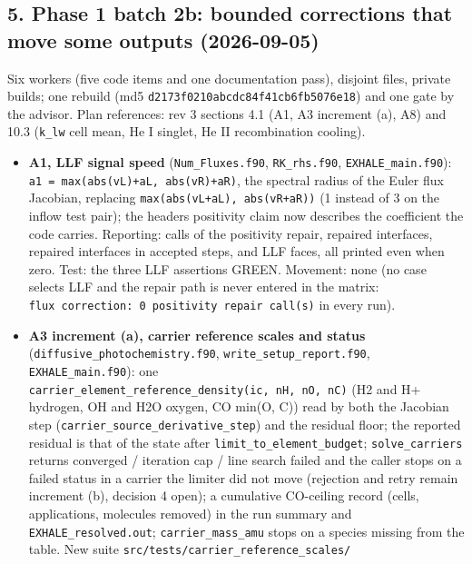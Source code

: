 \documentclass[english,a4paper]{my_memo}
\providecommand{\tightlist}{\setlength{\itemsep}{0pt}\setlength{\parskip}{0pt}}
\begin{document}
\subsection{5. Phase 1 batch 2b: bounded corrections that move some outputs (2026-09-05)}\label{5-phase-1-batch-2b-bounded-corrections-that-move-some-outputs-2026-09-05}

Six workers (five code items and one documentation pass), disjoint files,
private builds; one rebuild (md5 \texttt{d2173f0210abcdc84f41cb6fb5076e18}) and one
gate by the advisor. Plan references: rev 3 sections 4.1 (A1, A3 increment
(a), A8) and 10.3 (\texttt{k\_lw} cell mean, He I singlet, He II recombination
cooling).

\begin{itemize}
\tightlist
\item
  \textbf{A1, LLF signal speed} (\texttt{Num\_Fluxes.f90}, \texttt{RK\_rhs.f90}, \texttt{EXHALE\_main.f90}):
  \texttt{a1\ =\ max(abs(vL)+aL,\ abs(vR)+aR)}, the spectral radius of the Euler flux
  Jacobian, replacing \texttt{max(abs(vL+aL),\ abs(vR+aR))} (1 instead of 3 on the
  inflow test pair); the header\textquotesingle s positivity claim now describes the
  coefficient the code carries. Reporting: calls of the positivity repair,
  repaired interfaces, repaired interfaces in accepted steps, and LLF faces,
  all printed even when zero. Test: the three LLF assertions GREEN. Movement:
  none (no case selects LLF and the repair path is never entered in the
  matrix: \texttt{flux\ correction:\ 0\ positivity\ repair\ call(s)} in every run).
\item
  \textbf{A3 increment (a), carrier reference scales and status}
  (\texttt{diffusive\_photochemistry.f90}, \texttt{write\_setup\_report.f90},
  \texttt{EXHALE\_main.f90}): one \texttt{carrier\_element\_reference\_density(ic,\ nH,\ nO,\ nC)}
  (H2 and H+ hydrogen, OH and H2O oxygen, CO min(O, C)) read by both the
  Jacobian step (\texttt{carrier\_source\_derivative\_step}) and the residual floor;
  the reported residual is that of the state after \texttt{limit\_to\_element\_budget};
  \texttt{solve\_carriers} returns converged / iteration cap / line search failed and
  the caller stops on a failed status in a carrier the limiter did not move
  (rejection and retry remain increment (b), decision 4 open); a cumulative
  CO-ceiling record (cells, applications, molecules removed) in the run
  summary and \texttt{EXHALE\_resolved.out}; \texttt{carrier\_mass\_amu} stops on a species
  missing from the table. New suite \texttt{src/tests/carrier\_reference\_scales/}

\end{itemize}
\end{document}
